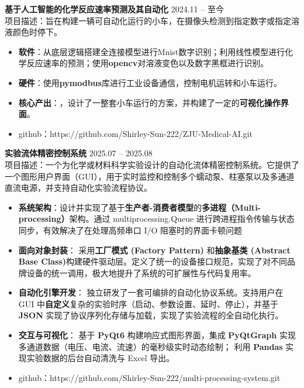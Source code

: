 \documentclass[11pt]{article}
\newlength{\interProjectSpacing}
\newcommand{\projectsep}{\vspace{\interProjectSpacing}}
\newlength{\intraProjectTitleSep}
\newcommand{\titlebreak}{\\[\intraProjectTitleSep]}
\newlength{\intraProjectListTopSep}
\begin{document}
\textbf{基于人工智能的化学反应速率预测及其自动化} \hfill 2024.11 -- 至今 \titlebreak
项目描述：旨在构建一辆可自动化运行的小车，在摄像头检测到指定数字或指定溶液颜色时停下。
\begin{itemize}[nosep, topsep=\intraProjectListTopSep]
    \item \textbf{软件}：从底层逻辑搭建全连接模型进行Mnist数字识别；利用线性模型进行化学反应速率的预测；使用\textbf{opencv}对溶液变色以及数字黑框进行识别。
    \item \textbf{硬件}：使用\textbf{pymodbus}库进行工业设备通信，控制电机运转和小车运行。
    \item \textbf{核心产出}：，设计了一整套小车运行的方案，并构建了一定的\textbf{可视化操作界面}。
    \item github：https://github.com/Shirley-Sun-222/ZJU-Medical-AI.git
\end{itemize}

\projectsep


\textbf{实验流体精密控制系统} \hfill 2025.07 -- 2025.08 \titlebreak
项目描述：一个为化学或材料科学实验设计的自动化流体精密控制系统。它提供了一个图形用户界面（GUI），用于实时监控和控制多个蠕动泵、柱塞泵以及多通道直流电源，并支持自动化实验流程协议。
\begin{itemize}[nosep, topsep=\intraProjectListTopSep]
    \item \textbf{系统架构}：设计并实现了基于\textbf{生产者-消费者模型}的\textbf{多进程（Multi-processing）}架构。通过 multiprocessing.Queue 进行跨进程指令传输与状态同步，有效解决了在处理高频串口 I/O 阻塞时的界面卡顿问题
    \item \textbf{面向对象封装}： 采用\textbf{工厂模式 (Factory Pattern)} 和\textbf{抽象基类 (Abstract Base Class)}构建硬件驱动层。定义了统一的设备接口规范，实现了对不同品牌设备的统一调用，极大地提升了系统的可扩展性与代码复用率。
    \item \textbf{自动化引擎开发}： 独立研发了一套可编排的自动化协议系统。支持用户在 GUI 中\textbf{自定义}复杂的实验时序（启动、参数设置、延时、停止），并基于 \textbf{JSON} 实现了协议序列化存储与加载，实现了实验流程的全自动化执行。
    \item \textbf{交互与可视化}： 基于 \textbf{PyQt6} 构建响应式图形界面，集成 \textbf{PyQtGraph} 实现多通道数据（电压、电流、流速）的毫秒级实时动态绘制；
    利用 \textbf{Pandas} 实现实验数据的后台自动清洗与 Excel 导出。
    \item github：https://github.com/Shirley-Sun-222/multi-processing-system.git
\end{itemize}
\end{document}
